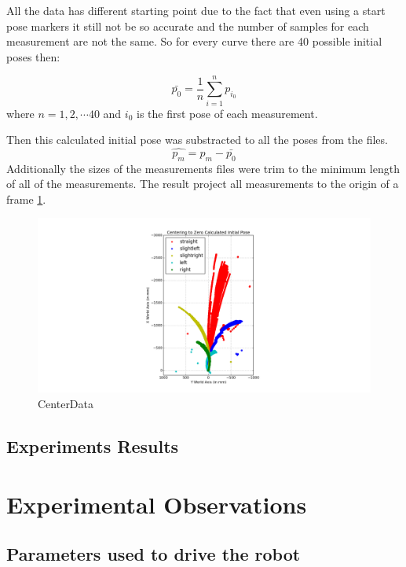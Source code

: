 \documentclass[10pt]{scrartcl}
\begin{document}
All the data has different starting point due to the fact that even using a start pose markers it still not be so accurate and the number of samples for each measurement are not the same. So for every curve there are 40 possible initial poses then:

\[	
	\bar{p_0} = \frac{1}{n} \sum_{i=1}^{n} p_{i_0}
\]
where $n = 1,2,\cdots 40$ and $i_0$ is the first pose of each measurement.

Then this calculated initial pose was substracted to all the poses from the files.
\[	
	\hat{p_m} = p_m - \bar{p_0}
\]
Additionally the sizes of the measurements files were trim to the minimum length of all of the measurements. The result project all measurements to the origin of a frame \ref{fig:preprocess}.

\begin{figure}[ht!]
\centering
\includegraphics[trim={220 0 0 0},clip,scale=0.5]{images/centerMeasurements}
\caption{CenterData}
\label{fig:preprocess}
\end{figure}

\newpage
\subsection*{Experiments Results}
\section*{Experimental Observations}
\subsection*{Parameters used to drive the robot}
\end{document}
